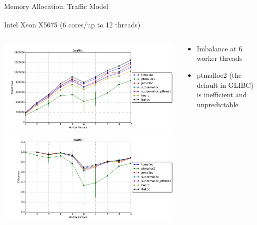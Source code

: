 \documentclass[10pt]{beamer}
\begin{document}
\begin{frame}{Memory Allocation: Traffic Model}
  \medskip
    \begin{block}{Intel\textsuperscript{\textregistered} Xeon\textsuperscript{\textregistered} X5675
        (6 cores/up to 12 threads)}
        \begin{columns}
        \begin{column}{0.7\textwidth}
            \smallskip
            \includegraphics[width=\textwidth]{../figs/memory_allocation/traffic_eventrate.pdf} \\[-0.15in]
            \includegraphics[width=\textwidth]{../figs/memory_allocation/traffic_efficiency.pdf}
        \end{column}
        \begin{column}{0.3\textwidth}
          \begin{small}
            \begin{itemize}
                \item Imbalance at 6 worker threads
                  \bigskip
                  \bigskip
                \item ptmalloc2 (the default in GLIBC) is inefficient and unpredictable
            \end{itemize}
          \end{small}
        \end{column}
        \end{columns}
    \end{block}
\end{frame}
\end{document}
